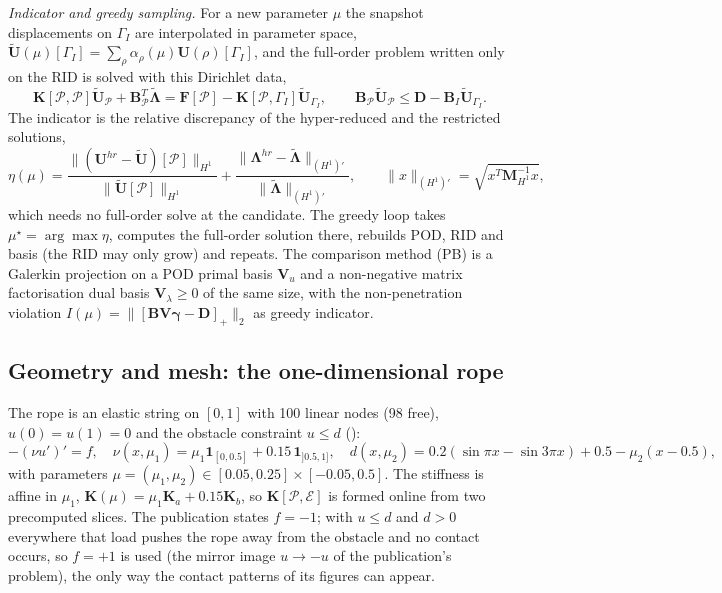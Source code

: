 \emph{Indicator and greedy sampling.} For a new parameter $\mu$ the snapshot displacements on $\Gamma_I$ are interpolated in parameter space, $\tilde{\mathbf U}(\mu)[\Gamma_I]=\sum_\rho\alpha_\rho(\mu)\mathbf U(\rho)[\Gamma_I]$, and the full-order problem written only on the RID is solved with this Dirichlet data,
\begin{equation}\label{eq:hb-restr}
\mathbf K[\mathcal P,\mathcal P]\tilde{\mathbf U}_{\mathcal P}+\mathbf B_{\mathcal P}^{T}\tilde{\boldsymbol\Lambda}=\mathbf F[\mathcal P]-\mathbf K[\mathcal P,\Gamma_I]\tilde{\mathbf U}_{\Gamma_I},\qquad\mathbf B_{\mathcal P}\tilde{\mathbf U}_{\mathcal P}\le\mathbf D-\mathbf B_I\tilde{\mathbf U}_{\Gamma_I}.
\end{equation}
The indicator is the relative discrepancy of the hyper-reduced and the restricted solutions,
\begin{equation}\label{eq:hb-eta}
\eta(\mu)=\frac{\lVert(\mathbf U^{hr}-\tilde{\mathbf U})[\mathcal P]\rVert_{H^1}}{\lVert\tilde{\mathbf U}[\mathcal P]\rVert_{H^1}}+\frac{\lVert\boldsymbol\Lambda^{hr}-\tilde{\boldsymbol\Lambda}\rVert_{(H^1)'}}{\lVert\tilde{\boldsymbol\Lambda}\rVert_{(H^1)'}},\qquad\lVert x\rVert_{(H^1)'}=\sqrt{x^{T}\mathbf M_{H^1}^{-1}x},
\end{equation}
which needs no full-order solve at the candidate. The greedy loop takes $\mu^\star=\arg\max\eta$, computes the full-order solution there, rebuilds POD, RID and basis (the RID may only grow) and repeats. The comparison method (PB) is a Galerkin projection on a POD primal basis $\mathbf V_u$ and a non-negative matrix factorisation dual basis $\mathbf V_\lambda\ge0$ of the same size, with the non-penetration violation $I(\mu)=\lVert[\mathbf B\mathbf V\boldsymbol\gamma-\mathbf D]_+\rVert_2$ as greedy indicator.

\subsection*{Geometry and mesh: the one-dimensional rope}

The rope is an elastic string on $[0,1]$ with 100 linear nodes (98 free), $u(0)=u(1)=0$ and the obstacle constraint $u\le d$ ():
\begin{equation}\label{eq:hb-rope}
-(\nu u')'=f,\quad\nu(x,\mu_1)=\mu_1\mathbf 1_{[0,0.5]}+0.15\,\mathbf 1_{]0.5,1]},\quad d(x,\mu_2)=0.2(\sin\pi x-\sin3\pi x)+0.5-\mu_2(x-0.5),
\end{equation}
with parameters $\mu=(\mu_1,\mu_2)\in[0.05,0.25]\times[-0.05,0.5]$. The stiffness is affine in $\mu_1$, $\mathbf K(\mu)=\mu_1\mathbf K_a+0.15\mathbf K_b$, so $\mathbf K[\mathcal P,\mathcal E]$ is formed online from two precomputed slices. The publication states $f=-1$; with $u\le d$ and $d>0$ everywhere that load pushes the rope away from the obstacle and no contact occurs, so $f=+1$ is used (the mirror image $u\to-u$ of the publication's problem), the only way the contact patterns of its figures can appear.

